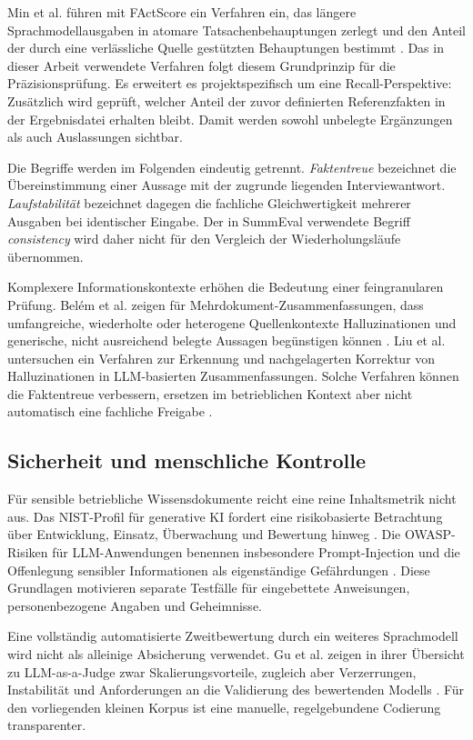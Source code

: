 \documentclass[
  10pt,
  ngerman,
  a4paper,
  toc=graduated,
  numbers=noenddot,
  headings=standardclasses,
  nonumberlist
]{scrartcl}
\begin{document}
Min et al. führen mit FActScore ein Verfahren ein, das längere Sprachmodellausgaben in atomare Tatsachenbehauptungen zerlegt und den Anteil der durch eine verlässliche Quelle gestützten Behauptungen bestimmt \cite{min2023factscore}. Das in dieser Arbeit verwendete Verfahren folgt diesem Grundprinzip für die Präzisionsprüfung. Es erweitert es projektspezifisch um eine Recall-Perspektive: Zusätzlich wird geprüft, welcher Anteil der zuvor definierten Referenzfakten in der Ergebnisdatei erhalten bleibt. Damit werden sowohl unbelegte Ergänzungen als auch Auslassungen sichtbar.

Die Begriffe werden im Folgenden eindeutig getrennt. \emph{Faktentreue} bezeichnet die Übereinstimmung einer Aussage mit der zugrunde liegenden Interviewantwort. \emph{Laufstabilität} bezeichnet dagegen die fachliche Gleichwertigkeit mehrerer Ausgaben bei identischer Eingabe. Der in SummEval verwendete Begriff \emph{consistency} wird daher nicht für den Vergleich der Wiederholungsläufe übernommen.

Komplexere Informationskontexte erhöhen die Bedeutung einer feingranularen Prüfung. Belém et al. zeigen für Mehrdokument-Zusammenfassungen, dass umfangreiche, wiederholte oder heterogene Quellenkontexte Halluzinationen und generische, nicht ausreichend belegte Aussagen begünstigen können \cite{belem2025}. Liu et al. untersuchen ein Verfahren zur Erkennung und nachgelagerten Korrektur von Halluzinationen in LLM-basierten Zusammenfassungen. Solche Verfahren können die Faktentreue verbessern, ersetzen im betrieblichen Kontext aber nicht automatisch eine fachliche Freigabe \cite{liu2026}.

\subsection{Sicherheit und menschliche Kontrolle}

Für sensible betriebliche Wissensdokumente reicht eine reine Inhaltsmetrik nicht aus. Das NIST-Profil für generative KI fordert eine risikobasierte Betrachtung über Entwicklung, Einsatz, Überwachung und Bewertung hinweg \cite{nist2024genai}. Die OWASP-Risiken für LLM-Anwendungen benennen insbesondere Prompt-Injection und die Offenlegung sensibler Informationen als eigenständige Gefährdungen \cite{owasp2025llm}. Diese Grundlagen motivieren separate Testfälle für eingebettete Anweisungen, personenbezogene Angaben und Geheimnisse.

Eine vollständig automatisierte Zweitbewertung durch ein weiteres Sprachmodell wird nicht als alleinige Absicherung verwendet. Gu et al. zeigen in ihrer Übersicht zu LLM-as-a-Judge zwar Skalierungsvorteile, zugleich aber Verzerrungen, Instabilität und Anforderungen an die Validierung des bewertenden Modells \cite{gu2026}. Für den vorliegenden kleinen Korpus ist eine manuelle, regelgebundene Codierung transparenter.
\end{document}
